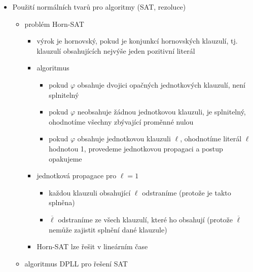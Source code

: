 \begin{itemize}
\begin{itemize}
\begin{itemize}
\begin{itemize}
\item pokud je první nemodel $(0,0,0)$, pak první klauzule bude $(p\lor q\lor r)$
\end{itemize}
\end{itemize}
\item syntaktický převod
\begin{itemize}
\item přepíšeme implikaci a ekvivalenci pomocí konjunkce, disjunkce a negace
\item přesuneme negace dovnitř (k literálům)
\item použijeme distributivitu konjunkce a disjunkce, abychom jednu přesunuli dovnitř (podle toho, jestli chceme CNF nebo DNF)
\end{itemize}
\end{itemize}
\item Použití normálních tvarů pro algoritmy (SAT, rezoluce)
\begin{itemize}
\item problém Horn-SAT
\begin{itemize}
\item výrok je hornovský, pokud je konjunkcí hornovských klauzulí, tj. klauzulí obsahujících nejvýše jeden pozitivní literál
\item algoritmus
\begin{itemize}
\item pokud $\varphi$ obsahuje dvojici opačných jednotkových klauzulí, není splnitelný
\item pokud $\varphi$ neobsahuje žádnou jednotkovou klauzuli, je splnitelný, ohodnotíme všechny zbývající proměnné nulou
\item pokud $\varphi$ obsahuje jednotkovou klauzuli $\ell$, ohodnotíme literál $\ell$ hodnotou 1, provedeme jednotkovou propagaci a postup opakujeme
\end{itemize}
\item jednotková propagace pro $\ell=1$
\begin{itemize}
\item každou klauzuli obsahující $\ell$ odstraníme (protože je takto splněna)
\item $\overline\ell$ odstraníme ze všech klauzulí, které ho obsahují (protože $\overline\ell$ nemůže zajistit splnění dané klauzule)
\end{itemize}
\item Horn-SAT lze řešit v lineárním čase
\end{itemize}
\item algoritmus DPLL pro řešení SAT

\end{itemize}
\end{itemize}

